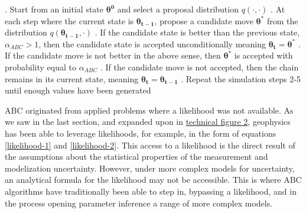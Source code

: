 \begin{algorithm}[H]
	\caption{ }
	\begin{algorithmic}
		. Start from an initial state $\bm{\theta^0}$ and select a proposal distribution $q(\cdot,\cdot)$
		. At each step where the current state is $\bm{\theta_{t-1}}$, propose a candidate 	move $\bm{\theta^*}$ from the distribution $q(\bm{\theta_{t-1}},\cdot)$		
		. If the candidate state is better than the previous state, $\alpha_{ABC} > 1$, then the candidate state is accepted unconditionally meaning $\bm{\theta_t} = \bm{\theta^*}$
		. If the candidate move is not better in the above sense, then $\bm{\theta^*}$ is accepted with probability equal to $\alpha_{ABC}$		
		. If the candidate move is not accepted, then the chain remains in its current state, meaning $\bm{\theta_{t}} = \bm{\theta_{t-1}}$		
		. Repeat the simulation steps 2-5 until enough values have been generated
	\end{algorithmic}
	\label{ABC-MCMC}
\end{algorithm}

ABC originated from applied problems where a likelihood was not available. As we saw in the last section, and expanded upon in \hyperref[tf2]{technical figure 2}, geophysics has been able to leverage likelihoods, for example, in the form of equations \ref{likelihood-1} and \ref{likelihood-2}. This access to a likelihood is the direct result of the assumptions about the statistical properties of the measurement and modelization uncertainty. However, under more complex models for uncertainty, an analytical formula for the likelihood may not be accessible. This is where ABC algorithms have traditionally been able to step in, bypassing a likelihood, and in the process opening parameter inference a range of more complex models. \par


